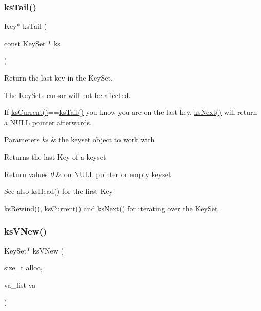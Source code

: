 \subsubsection{\texorpdfstring{ks\+Tail()}{ksTail()}}
{\footnotesize\ttfamily Key$\ast$ ks\+Tail (\begin{DoxyParamCaption}\item[{const Key\+Set $\ast$}]{ks }\end{DoxyParamCaption})}



Return the last key in the Key\+Set. 

The Key\+Sets cursor will not be affected.

If \hyperlink{group__keyset_ga4287b9416912c5f2ab9c195cb74fb094}{ks\+Current()}==\hyperlink{group__keyset_gadca442c4ab43cf532b15091d7711559e}{ks\+Tail()} you know you are on the last key. \hyperlink{group__keyset_ga317321c9065b5a4b3e33fe1c399bcec9}{ks\+Next()} will return a N\+U\+LL pointer afterwards.


\begin{DoxyParams}{Parameters}
{\em ks} & the keyset object to work with \\
\hline
\end{DoxyParams}
\begin{DoxyReturn}{Returns}
the last Key of a keyset 
\end{DoxyReturn}

\begin{DoxyRetVals}{Return values}
{\em 0} & on N\+U\+LL pointer or empty keyset \\
\hline
\end{DoxyRetVals}
\begin{DoxySeeAlso}{See also}
\hyperlink{group__keyset_gae7dbf3aef70e67b5328475eb3d1f92f5}{ks\+Head()} for the first \hyperlink{group__key}{Key} 

\hyperlink{group__keyset_gabe793ff51f1728e3429c84a8a9086b70}{ks\+Rewind()}, \hyperlink{group__keyset_ga4287b9416912c5f2ab9c195cb74fb094}{ks\+Current()} and \hyperlink{group__keyset_ga317321c9065b5a4b3e33fe1c399bcec9}{ks\+Next()} for iterating over the \hyperlink{group__keyset}{Key\+Set} 
\end{DoxySeeAlso}
\mbox{\label{group__keyset_ga4ff760f56693b51ab785ed7ce628e649}} 
\subsubsection{\texorpdfstring{ks\+V\+New()}{ksVNew()}}
{\footnotesize\ttfamily Key\+Set$\ast$ ks\+V\+New (\begin{DoxyParamCaption}\item[{size\+\_\+t}]{alloc,  }\item[{va\+\_\+list}]{va }\end{DoxyParamCaption})}



